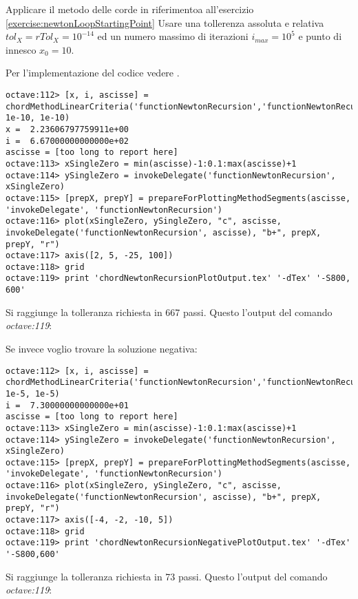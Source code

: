 \begin{exercise}
Applicare il metodo delle corde in riferimentoa all'esercizio
\ref{exercise:newtonLoopStartingPoint} 
Usare una tollerenza assoluta e relativa
$tol_{X} = rTol_{X} = 10^{-14}$ ed un numero massimo di iterazioni
$i_{max} = 10^{5}$ e punto di innesco $x_{0} = 10$.
\end{exercise}
Per l'implementazione del codice vedere .
\begin{lstlisting}
octave:112> [x, i, ascisse] = chordMethodLinearCriteria('functionNewtonRecursion','functionNewtonRecursionDerivative',10,1e5, 1e-10, 1e-10)
x =  2.23606797759911e+00
i =  6.67000000000000e+02
ascisse = [too long to report here]
octave:113> xSingleZero = min(ascisse)-1:0.1:max(ascisse)+1
octave:114> ySingleZero = invokeDelegate('functionNewtonRecursion', xSingleZero)
octave:115> [prepX, prepY] = prepareForPlottingMethodSegments(ascisse, 'invokeDelegate', 'functionNewtonRecursion')
octave:116> plot(xSingleZero, ySingleZero, "c", ascisse, invokeDelegate('functionNewtonRecursion', ascisse), "b+", prepX, prepY, "r")
octave:117> axis([2, 5, -25, 100])
octave:118> grid
octave:119> print 'chordNewtonRecursionPlotOutput.tex' '-dTex' '-S800, 600'
\end{lstlisting}
Si raggiunge la tolleranza richiesta in 667 passi. Questo l'output del comando
\emph{octave:119}:
\begin{center}

\end{center}

Se invece voglio trovare la soluzione negativa:
\begin{lstlisting}
octave:112> [x, i, ascisse] = chordMethodLinearCriteria('functionNewtonRecursion','functionNewtonRecursionDerivative',-5,1e5, 1e-5, 1e-5)
i =  7.30000000000000e+01
ascisse = [too long to report here]
octave:113> xSingleZero = min(ascisse)-1:0.1:max(ascisse)+1
octave:114> ySingleZero = invokeDelegate('functionNewtonRecursion', xSingleZero)
octave:115> [prepX, prepY] = prepareForPlottingMethodSegments(ascisse, 'invokeDelegate', 'functionNewtonRecursion')
octave:116> plot(xSingleZero, ySingleZero, "c", ascisse, invokeDelegate('functionNewtonRecursion', ascisse), "b+", prepX, prepY, "r")
octave:117> axis([-4, -2, -10, 5])
octave:118> grid
octave:119> print 'chordNewtonRecursionNegativePlotOutput.tex' '-dTex' '-S800,600'
\end{lstlisting}
Si raggiunge la tolleranza richiesta in 73 passi. Questo l'output del comando
\emph{octave:119}:
\begin{center}

\end{center}

